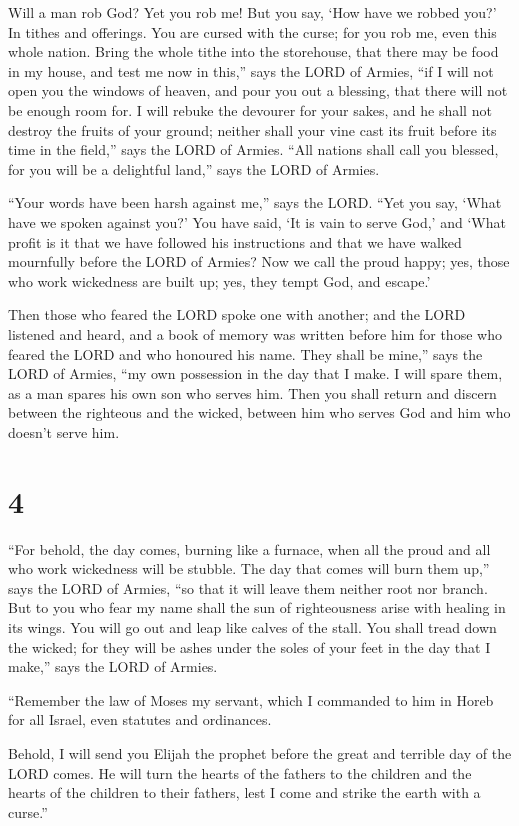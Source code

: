  Will a man rob God? Yet you rob me! But you say, `How
have we robbed you?' In tithes and offerings.  You are
cursed with the curse; for you rob me, even this whole nation.
 Bring the whole tithe into the storehouse, that there
may be food in my house, and test me now in this,'' says the LORD of
Armies, ``if I will not open you the windows of heaven, and pour you out
a blessing, that there will not be enough room for.  I
will rebuke the devourer for your sakes, and he shall not destroy the
fruits of your ground; neither shall your vine cast its fruit before its
time in the field,'' says the LORD of Armies.  ``All
nations shall call you blessed, for you will be a delightful land,''
says the LORD of Armies.

 ``Your words have been harsh against me,'' says the
LORD. ``Yet you say, `What have we spoken against you?' 
You have said, `It is vain to serve God,' and `What profit is it that we
have followed his instructions and that we have walked mournfully before
the LORD of Armies?  Now we call the proud happy; yes,
those who work wickedness are built up; yes, they tempt God, and
escape.'

 Then those who feared the LORD spoke one with another;
and the LORD listened and heard, and a book of memory was written before
him for those who feared the LORD and who honoured his name.
 They shall be mine,'' says the LORD of Armies, ``my own
possession in the day that I make. I will spare them, as a man spares
his own son who serves him.  Then you shall return and
discern between the righteous and the wicked, between him who serves God
and him who doesn't serve him.

\hypertarget{section-3}{%
\section{4}\label{section-3}}

 ``For behold, the day comes, burning like a furnace, when
all the proud and all who work wickedness will be stubble. The day that
comes will burn them up,'' says the LORD of Armies, ``so that it will
leave them neither root nor branch.  But to you who fear
my name shall the sun of righteousness arise with healing in its wings.
You will go out and leap like calves of the stall.  You
shall tread down the wicked; for they will be ashes under the soles of
your feet in the day that I make,'' says the LORD of Armies.

 ``Remember the law of Moses my servant, which I commanded
to him in Horeb for all Israel, even statutes and ordinances.

 Behold, I will send you Elijah the prophet before the
great and terrible day of the LORD comes.  He will turn
the hearts of the fathers to the children and the hearts of the children
to their fathers, lest I come and strike the earth with a curse.''
